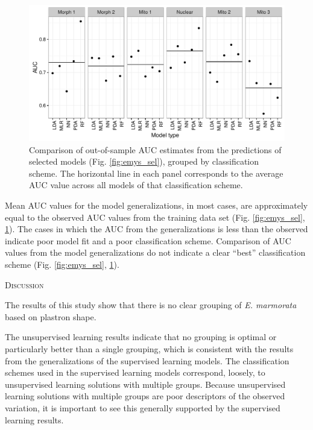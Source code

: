 \documentclass[12pt,letterpaper]{article}
\renewcommand{\section}[1]{%
\bigskip
\begin{center}
\begin{Large}
\normalfont\scshape #1
\medskip
\end{Large}
\end{center}}
\begin{document}
\begin{figure}[ht]
  \centering
  \includegraphics[height = \textheight, width = \textwidth, keepaspectratio = true]{figure/emys_oos_sel}
  \caption{Comparison of out-of-sample AUC estimates from the predictions of selected models (Fig. \ref{fig:emys_sel}), grouped by classification scheme. The horizontal line in each panel corresponds to the average AUC value across all models of that classification scheme.}
  \label{fig:emys_oos}
\end{figure}

Mean AUC values for the model generalizations, in most cases, are approximately equal to the observed AUC values from the training data set (Fig. \ref{fig:emys_sel}, \ref{fig:emys_oos}). The  cases in which the AUC from the  generalizations is less than the observed indicate poor model fit and a poor classification scheme. Comparison of AUC values from the model generalizations do not indicate a clear ``best'' classification scheme (Fig. \ref{fig:emys_sel}, \ref{fig:emys_oos}). 

\section{Discussion}

The results of this study show that there is no clear grouping of \textit{E. marmorata} based on plastron shape.

The unsupervised learning results indicate that no grouping is optimal or particularly better than a single grouping, which is consistent with the results from the generalizations of the supervised learning models. The classification schemes used in the supervised learning models correspond, loosely, to unsupervised learning solutions with multiple groups. Because unsupervised learning solutions with multiple groups are poor descriptors of the observed variation, it is important to see this generally supported by the supervised learning results.
\end{document}
